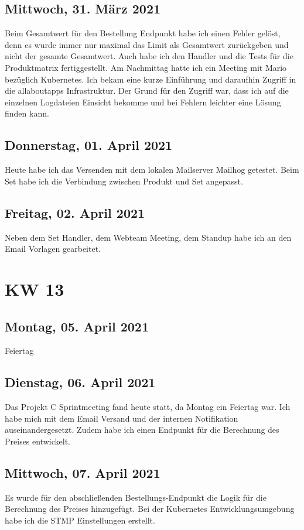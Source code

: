 \section{Mittwoch, 31. März 2021}
Beim Gesamtwert für den Bestellung Endpunkt habe ich einen Fehler gelöst, denn es wurde immer nur maximal das Limit als Gesamtwert zurückgeben und nicht der gesamte Gesamtwert. Auch habe ich den Handler und die Tests für die Produktmatrix fertiggestellt. Am Nachmittag hatte ich ein Meeting mit Mario bezüglich Kubernetes. Ich bekam eine kurze Einführung und daraufhin Zugriff in die allaboutapps Infrastruktur. Der Grund für den Zugriff war, dass ich auf die einzelnen Logdateien Einsicht bekomme und bei Fehlern leichter eine Lösung finden kann.

\section{Donnerstag, 01. April 2021}
Heute habe ich das Versenden mit dem lokalen Mailserver Mailhog getestet. Beim Set habe ich die Verbindung zwischen Produkt und Set angepasst.

\section{Freitag, 02. April 2021}
Neben dem Set Handler, dem Webteam Meeting, dem Standup habe ich an den Email Vorlagen gearbeitet.


\chapter{KW 13}

\section{Montag, 05. April 2021}
Feiertag

\section{Dienstag, 06. April 2021}
Das Projekt C Sprintmeeting fand heute statt, da Montag ein Feiertag war. Ich habe mich mit dem Email Versand und der internen Notifikation auseinandergesetzt. Zudem habe ich einen Endpunkt für die Berechnung des Preises entwickelt.

\section{Mittwoch, 07. April 2021}
Es wurde für den abschließenden Bestellungs-Endpunkt die Logik für die Berechnung des Preises hinzugefügt. Bei der Kubernetes Entwicklungsumgebung habe ich die STMP Einstellungen erstellt. 

